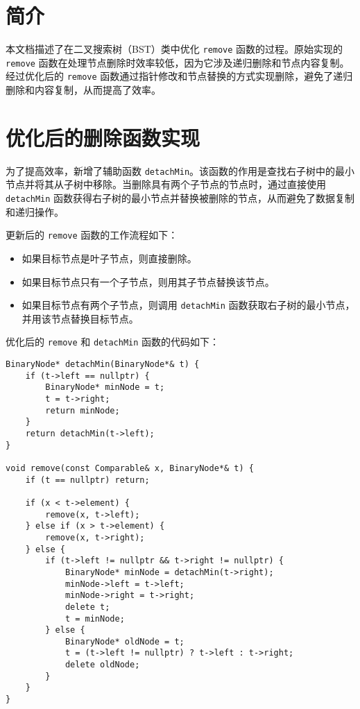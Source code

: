 \documentclass[Unicode]{ctexart}
\begin{document}
\pagestyle{fancy}
\fancyhead{}

  
\section{简介}
本文档描述了在二叉搜索树（BST）类中优化 \texttt{remove} 函数的过程。原始实现的 \texttt{remove} 函数在处理节点删除时效率较低，因为它涉及递归删除和节点内容复制。经过优化后的 \texttt{remove} 函数通过指针修改和节点替换的方式实现删除，避免了递归删除和内容复制，从而提高了效率。

\section{优化后的删除函数实现}
为了提高效率，新增了辅助函数 \texttt{detachMin}。该函数的作用是查找右子树中的最小节点并将其从子树中移除。当删除具有两个子节点的节点时，通过直接使用 \texttt{detachMin} 函数获得右子树的最小节点并替换被删除的节点，从而避免了数据复制和递归操作。

更新后的 \texttt{remove} 函数的工作流程如下：
\begin{itemize}
    \item 如果目标节点是叶子节点，则直接删除。
    \item 如果目标节点只有一个子节点，则用其子节点替换该节点。
    \item 如果目标节点有两个子节点，则调用 \texttt{detachMin} 函数获取右子树的最小节点，并用该节点替换目标节点。
\end{itemize}

优化后的 \texttt{remove} 和 \texttt{detachMin} 函数的代码如下：

\begin{verbatim}
BinaryNode* detachMin(BinaryNode*& t) {
    if (t->left == nullptr) {
        BinaryNode* minNode = t;
        t = t->right;
        return minNode;
    }
    return detachMin(t->left);
}

void remove(const Comparable& x, BinaryNode*& t) {
    if (t == nullptr) return;

    if (x < t->element) {
        remove(x, t->left);
    } else if (x > t->element) {
        remove(x, t->right);
    } else {
        if (t->left != nullptr && t->right != nullptr) {
            BinaryNode* minNode = detachMin(t->right);
            minNode->left = t->left;
            minNode->right = t->right;
            delete t;
            t = minNode;
        } else {
            BinaryNode* oldNode = t;
            t = (t->left != nullptr) ? t->left : t->right;
            delete oldNode;
        }
    }
}
\end{verbatim}
\end{document}
